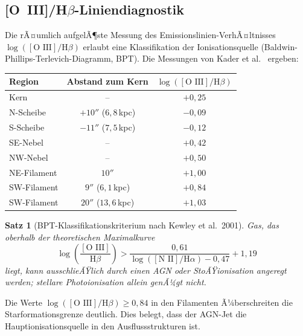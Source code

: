 ﻿\documentclass[12pt,a4paper]{report}
\newtheorem{theorem}{Satz}[chapter]
\begin{document}
\subsection{[O~III]/H$\beta$-Liniendiagnostik}

Die rÃ¤umlich aufgelÃ¶ste Messung des Emissionslinien-VerhÃ¤ltnisses $\log([\text{O~III}]/\text{H}\beta)$ erlaubt eine Klassifikation der Ionisationsquelle (Baldwin-Phillips-Terlevich-Diagramm, BPT). Die Messungen von Kader et al.\ \cite{kader2026} ergeben:

\begin{center}
	\begin{tabular}{lcc}
		\hline
		\textbf{Region} & \textbf{Abstand zum Kern} & $\log([\text{O III}]/\text{H}\beta)$ \\
		\hline
		Kern & -- & $+0{,}25$ \\
		N-Scheibe & $+10''$ ($6{,}8$\,kpc) & $-0{,}09$ \\
		S-Scheibe & $-11''$ ($7{,}5$\,kpc) & $-0{,}12$ \\
		SE-Nebel & -- & $+0{,}42$ \\
		NW-Nebel & -- & $+0{,}50$ \\
		NE-Filament & $10''$ & $+1{,}00$ \\
		SW-Filament & $9''$ ($6{,}1$\,kpc) & $+0{,}84$ \\
		SW-Filament & $20''$ ($13{,}6$\,kpc) & $+1{,}03$ \\
		\hline
	\end{tabular}
\end{center}

\begin{theorem}[BPT-Klassifikationskriterium nach Kewley et al.\ 2001]
	Gas, das oberhalb der theoretischen Maximalkurve
	\begin{equation}
		\log\left(\frac{[\text{O III}]}{\text{H}\beta}\right) > \frac{0{,}61}{\log([\text{N~II}]/\text{H}\alpha) - 0{,}47} + 1{,}19
	\end{equation}
	liegt, kann ausschlieÃŸlich durch einen AGN oder StoÃŸionisation angeregt werden; stellare Photoionisation allein genÃ¼gt nicht.
\end{theorem}

Die Werte $\log([\text{O III}]/\text{H}\beta) \geq 0{,}84$ in den Filamenten Ã¼berschreiten die Starformations\-grenze deutlich. Dies belegt, dass der AGN-Jet die Hauptionisationsquelle in den Ausfluss\-strukturen ist.
\end{document}

